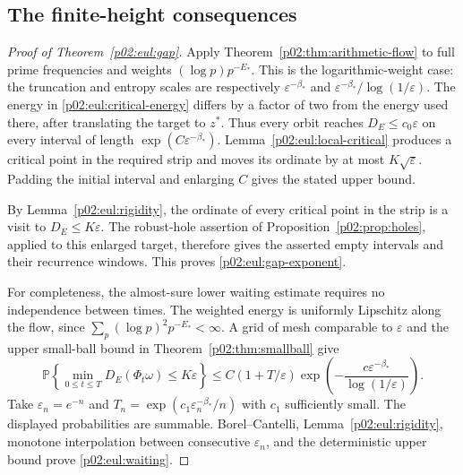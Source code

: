 \documentclass[11pt,letterpaper]{article}
\theoremstyle{definition}
\theoremstyle{remark}
\newcommand{\eps}{\varepsilon}
\newcommand{\1}{\mathbf 1}
\begin{document}
\subsection{The finite-height consequences}

\begin{proof}[Proof of Theorem~\ref{p02:eul:gap}]
Apply Theorem~\ref{p02:thm:arithmetic-flow} to full prime frequencies and
weights $(\log p)p^{-E_*}$. This is the logarithmic-weight case:
the truncation and entropy scales are respectively
$\eps^{-\beta_*}$ and $\eps^{-\beta_*}/\log(1/\eps)$.
The energy in \eqref{p02:eul:critical-energy} differs by a factor of
two from the energy used there, after translating the target to $z^*$.
Thus every orbit reaches $D_E\le c_0\eps$ on every interval of
length $\exp(C\eps^{-\beta_*})$. Lemma~\ref{p02:eul:local-critical}
produces a critical point in the required strip and moves its ordinate
by at most $K\sqrt\eps$. Padding the initial interval and enlarging
$C$ gives the stated upper bound.

By Lemma~\ref{p02:eul:rigidity}, the ordinate of every critical point in
the strip is a visit to $D_E\le K\eps$. The robust-hole assertion
of Proposition~\ref{p02:prop:holes}, applied to this enlarged target,
therefore gives the asserted empty intervals and their recurrence
windows. This proves \eqref{p02:eul:gap-exponent}.

For completeness, the almost-sure lower waiting estimate requires no
independence between times. The weighted energy is uniformly Lipschitz
along the flow, since $\sum_p(\log p)^2p^{-E_*}<\infty$.
A grid of mesh comparable to $\eps$ and the upper small-ball bound
in Theorem~\ref{p02:thm:smallball} give
\[
 \mathbb P\!\left\{\min_{0\le t\le T}D_E(\Phi_t\omega)\le K\eps\right\}
 \le C(1+T/\eps)
 \exp\!\left(-\frac{c\eps^{-\beta_*}}{\log(1/\eps)}\right).
\]
Take $\eps_n=e^{-n}$ and
$T_n=\exp(c_1\eps_n^{-\beta_*}/n)$ with $c_1$ sufficiently small.
The displayed probabilities are summable. Borel--Cantelli,
Lemma~\ref{p02:eul:rigidity}, monotone interpolation between consecutive
$\eps_n$, and the deterministic upper bound prove
\eqref{p02:eul:waiting}.
\end{proof}
\end{document}
